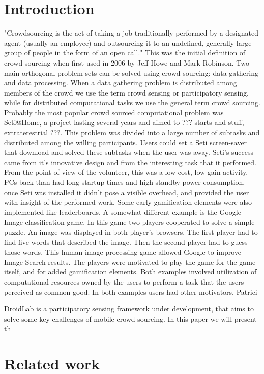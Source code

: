 \documentclass[conference,letterpaper]{IEEEtran}
\begin{document}
\section{Introduction}
\label{sec:intro}
"Crowdsourcing is the act of taking a job traditionally performed by a designated agent (usually an employee) and outsourcing it to an undefined, generally large group of people in the form of an open call." This was the initial definition of crowd sourcing when first used in 2006  by Jeff Howe and Mark Robinson. Two main orthogonal problem sets can be solved using crowd sourcing: data gathering and data processing. When a data gathering problem is distributed among members of the crowd we use the term crowd sensing or participatory sensing, while for distributed computational tasks we use the general term crowd sourcing. Probably the most popular crowd sourced computational problem was Seti@Home, a project lasting several years and aimed to ??? starts and stuff, extraterestrial ???. This problem was divided into a large number of subtasks and distributed among the willing participants. Users could set a Seti screen-saver that download and solved these subtasks when the user was away. Seti's success came from it's innovative design and from the interesting task that it performed. From the point of view of the volunteer, this was a low cost, low gain activity. PCs back than had long startup times and high standby power consumption, once Seti was installed it didn't pose a visible overhead, and provided the user with insight of the performed work. Some early gamification elements were also implemented like leaderboards. A somewhat different example is the Google Image classification game. In this game two players cooperated to solve a simple puzzle. An image was displayed in both player's browsers. The first player had to find five words that described the image. Then the second player had to guess those words. This human image processing game allowed Google to improve Image Search results. The players were motivated to play the game for the game itself, and for added gamification elements. Both examples involved utilization of computational resources owned by the users to perform a task that the users perceived as common good. In both examples users had other motivators.
Patrici

DroidLab is a participatory sensing framework under development, that aims to solve some key challenges of mobile crowd sourcing. In this paper we will present th
\section{Related work}
\label{sec:related_work}
\end{document}
